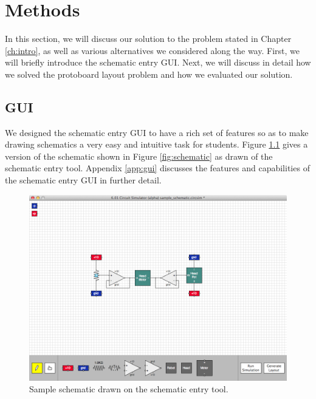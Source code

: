 
\chapter{Methods}
\label{ch:methods}

In this section, we will discuss our solution to the problem stated in Chapter
\ref{ch:intro}, as well as various alternatives we considered along the way.
First, we will
briefly introduce the schematic entry GUI. Next, we will discuss in detail how
we solved the protoboard layout problem and how we evaluated our solution.

\section{GUI}

We designed the schematic entry GUI to have a rich set of features so as to make
drawing schematics a very easy and intuitive task for students.
Figure \ref{fig:gui_example} gives a version of the schematic shown in Figure
\ref{fig:schematic} as drawn of the schematic entry tool. Appendix \ref{app:gui}
discusses the features and capabilities of the schematic entry GUI in
further detail.

\begin{figure}
\begin{center}
\includegraphics[width=\textwidth]{Images/gui_example.png}
\caption{Sample schematic drawn on the schematic entry tool.}
\label{fig:gui_example}
\end{center}
\end{figure}

